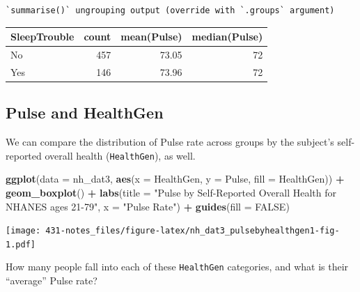 \documentclass[
]{book}
\newenvironment{Shaded}{\begin{snugshade}}{\end{snugshade}}
\newcommand{\DataTypeTok}[1]{\textcolor[rgb]{0.13,0.29,0.53}{#1}}
\newcommand{\DecValTok}[1]{\textcolor[rgb]{0.00,0.00,0.81}{#1}}
\newcommand{\KeywordTok}[1]{\textcolor[rgb]{0.13,0.29,0.53}{\textbf{#1}}}
\newcommand{\NormalTok}[1]{#1}
\newcommand{\OperatorTok}[1]{\textcolor[rgb]{0.81,0.36,0.00}{\textbf{#1}}}
\newcommand{\OtherTok}[1]{\textcolor[rgb]{0.56,0.35,0.01}{#1}}
\newcommand{\StringTok}[1]{\textcolor[rgb]{0.31,0.60,0.02}{#1}}
\begin{document}
\begin{verbatim}
`summarise()` ungrouping output (override with `.groups` argument)
\end{verbatim}

\begin{tabular}{l|r|r|r}
\hline
SleepTrouble & count & mean(Pulse) & median(Pulse)\\
\hline
No & 457 & 73.05 & 72\\
\hline
Yes & 146 & 73.96 & 72\\
\hline
\end{tabular}

\hypertarget{pulse-and-healthgen}{%
\subsection{Pulse and HealthGen}\label{pulse-and-healthgen}}

We can compare the distribution of Pulse rate across groups by the subject's self-reported overall health (\texttt{HealthGen}), as well.

\begin{Shaded}
\begin{Highlighting}[]
\KeywordTok{ggplot}\NormalTok{(}\DataTypeTok{data =}\NormalTok{ nh_dat3, }\KeywordTok{aes}\NormalTok{(}\DataTypeTok{x =}\NormalTok{ HealthGen, }\DataTypeTok{y =}\NormalTok{ Pulse, }\DataTypeTok{fill =}\NormalTok{ HealthGen)) }\OperatorTok{+}\StringTok{ }
\StringTok{    }\KeywordTok{geom_boxplot}\NormalTok{() }\OperatorTok{+}
\StringTok{    }\KeywordTok{labs}\NormalTok{(}\DataTypeTok{title =} \StringTok{"Pulse by Self-Reported Overall Health for NHANES ages 21-79"}\NormalTok{,}
         \DataTypeTok{x =} \StringTok{"Pulse Rate"}\NormalTok{) }\OperatorTok{+}\StringTok{ }
\StringTok{    }\KeywordTok{guides}\NormalTok{(}\DataTypeTok{fill =} \OtherTok{FALSE}\NormalTok{) }
\end{Highlighting}
\end{Shaded}

\texttt{[image: 431-notes\_files/figure-latex/nh\_dat3\_pulsebyhealthgen1-fig-1.pdf]}

How many people fall into each of these \texttt{HealthGen} categories, and what is their ``average'' Pulse rate?

\begin{Shaded}
\end{Shaded}
\end{document}
